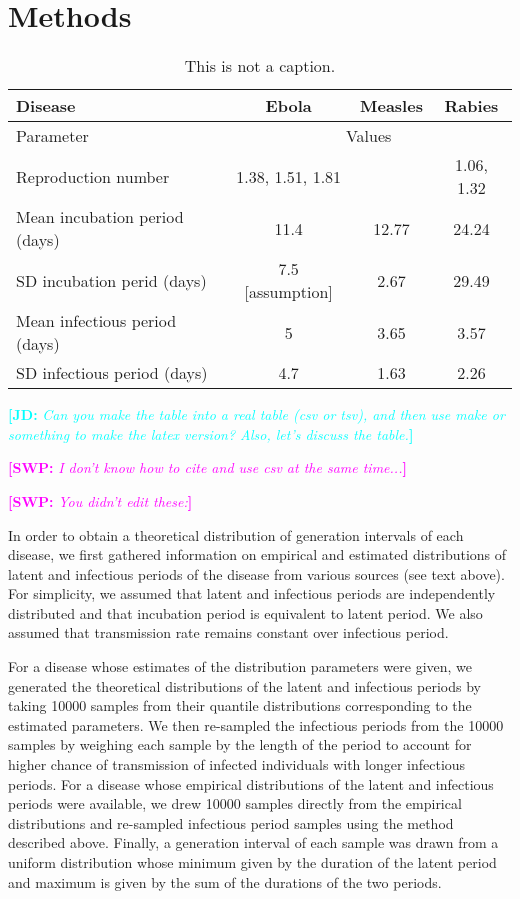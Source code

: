 \documentclass[12pt,]{article}
\newcommand{\tlab}[1]{\label{tab:#1}}
\newcommand{\comment}[3]{\textcolor{#1}{\textbf{[#2: }\textit{#3}\textbf{]}}}
\newcommand{\jd}[1]{\comment{cyan}{JD}{#1}}
\newcommand{\swp}[1]{\comment{magenta}{SWP}{#1}}
\begin{document}
\section{Methods}

\begin{table}[h!]
\centering
\begin{tabular}{l*{3}{c}}
\hline
Disease & Ebola & Measles & Rabies\\
\hline
Parameter & \multicolumn{3}{c}{Values}\\
\hline
Reproduction number & 1.38, 1.51, 1.81 \cite{WHO14} & & 1.06, 1.32 \cite{HampDush09} \\
Mean incubation period (days) & 11.4 \cite{WHO14} & 12.77 \cite{LessReic09inc}  & 24.24 \cite{HampDush09} \\
SD incubation perid (days) & 7.5 [assumption] & 2.67 \cite{LessReic09inc} & 29.49 \cite{HampDush09} \\
Mean infectious period (days) & 5 \cite{WHO14} & 3.65 \cite{Lloy01} & 3.57 \cite{HampDush09} \\
SD infectious period (days) & 4.7 \cite{WHO14} & 1.63 \cite{Lloy01} & 2.26 \cite{HampDush09}
\end{tabular}
\caption{This is not a caption.}
\tlab{parameters}
\end{table}

\jd{Can you make the table into a real table (csv or tsv), and then use make or something to make the latex version? Also, let's discuss the table.}

\swp{I don't know how to cite and use csv at the same time...}

\swp{You didn't edit these:}

In order to obtain a theoretical distribution of generation intervals of each disease, we first gathered information on empirical and estimated distributions of latent and infectious periods of the disease from various sources (see text above). For simplicity, we assumed that latent and infectious periods are independently distributed and that incubation period is equivalent to latent period. We also assumed that transmission rate remains constant over infectious period.

For a disease whose estimates of the distribution parameters were given, we generated the theoretical distributions of the latent and infectious periods by taking 10000 samples from their quantile distributions corresponding to the estimated parameters. We then re-sampled the infectious periods from the 10000 samples by weighing each sample by the length of the period to account for higher chance of transmission of infected individuals with longer infectious periods. 
For a disease whose empirical distributions of the latent and infectious periods were available, we drew 10000 samples directly from the empirical distributions and re-sampled infectious period samples using the method described above.
Finally, a generation interval of each sample was drawn from a uniform distribution whose minimum given by the duration of the latent period and maximum is given by the sum of the durations of the two periods.
\end{document}
